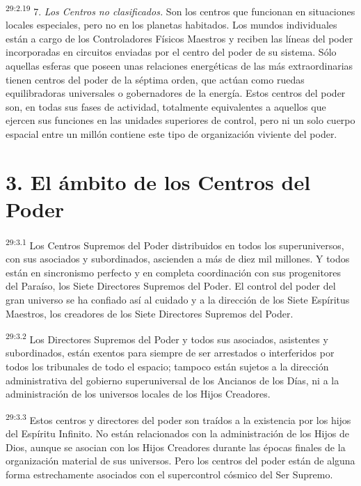 \par
\textsuperscript{29:2.19} 7. \textit{Los Centros no clasificados.} Son los centros que funcionan en situaciones locales especiales, pero no en los planetas habitados. Los mundos individuales están a cargo de los Controladores Físicos Maestros y reciben las líneas del poder incorporadas en circuitos enviadas por el centro del poder de su sistema. Sólo aquellas esferas que poseen unas relaciones energéticas de las más extraordinarias tienen centros del poder de la séptima orden, que actúan como ruedas equilibradoras universales o gobernadores de la energía. Estos centros del poder son, en todas sus fases de actividad, totalmente equivalentes a aquellos que ejercen sus funciones en las unidades superiores de control, pero ni un solo cuerpo espacial entre un millón contiene este tipo de organización viviente del poder.

\section*{3. El ámbito de los Centros del Poder}
\par
\textsuperscript{29:3.1} Los Centros Supremos del Poder distribuidos en todos los superuniversos, con sus asociados y subordinados, ascienden a más de diez mil millones. Y todos están en sincronismo perfecto y en completa coordinación con sus progenitores del Paraíso, los Siete Directores Supremos del Poder. El control del poder del gran universo se ha confiado así al cuidado y a la dirección de los Siete Espíritus Maestros, los creadores de los Siete Directores Supremos del Poder.

\par
\textsuperscript{29:3.2} Los Directores Supremos del Poder y todos sus asociados, asistentes y subordinados, están exentos para siempre de ser arrestados o interferidos por todos los tribunales de todo el espacio; tampoco están sujetos a la dirección administrativa del gobierno superuniversal de los Ancianos de los Días, ni a la administración de los universos locales de los Hijos Creadores.

\par
\textsuperscript{29:3.3} Estos centros y directores del poder son traídos a la existencia por los hijos del Espíritu Infinito. No están relacionados con la administración de los Hijos de Dios, aunque se asocian con los Hijos Creadores durante las épocas finales de la organización material de sus universos. Pero los centros del poder están de alguna forma estrechamente asociados con el supercontrol cósmico del Ser Supremo.

